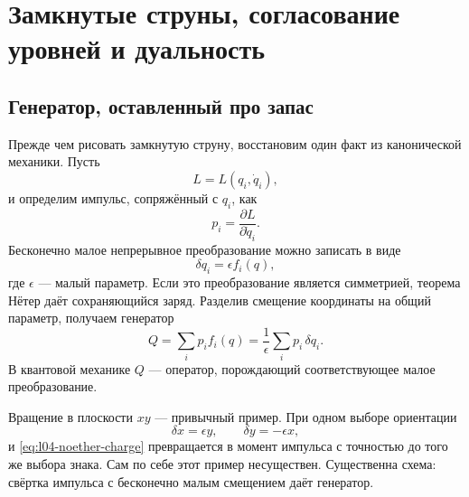 \chapter{Замкнутые струны, согласование уровней и дуальность}


\section{Генератор, оставленный про запас}

Прежде чем рисовать замкнутую струну, восстановим один факт из канонической механики. Пусть
\begin{equation}
  L=L(q_i,\dot q_i),
\end{equation}
и определим импульс, сопряжённый с \(q_i\), как
\begin{equation}
  p_i=\frac{\partial L}{\partial\dot q_i}.
\end{equation}
Бесконечно малое непрерывное преобразование можно записать в виде
\begin{equation}
  \delta q_i=\epsilon f_i(q),
  \label{eq:l04-infinitesimal-transformation}
\end{equation}
где \(\epsilon\) — малый параметр. Если это преобразование является симметрией, теорема Нётер даёт сохраняющийся заряд. Разделив смещение координаты на общий параметр, получаем генератор
\begin{equation}
  Q=\sum_i p_i f_i(q)
   =\frac{1}{\epsilon}\sum_i p_i\,\delta q_i.
  \label{eq:l04-noether-charge}
\end{equation}
В квантовой механике \(Q\) — оператор, порождающий соответствующее малое преобразование.

Вращение в плоскости \(xy\) — привычный пример. При одном выборе ориентации
\begin{equation}
  \delta x=\epsilon y,
  \qquad
  \delta y=-\epsilon x,
\end{equation}
и \eqref{eq:l04-noether-charge} превращается в момент импульса с точностью до того же выбора знака. Сам по себе этот пример несуществен. Существенна схема: свёртка импульса с бесконечно малым смещением даёт генератор.

